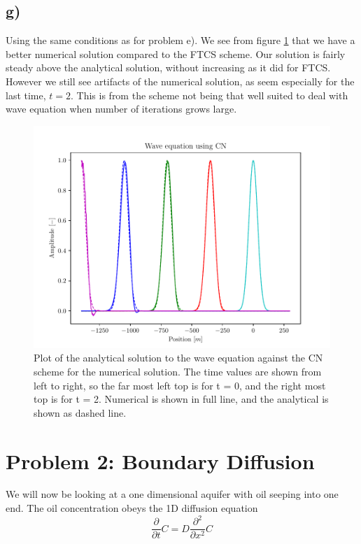 \documentclass[10pt, a4paper]{amsart}
\begin{document}
\subsection{g)}
Using the same conditions as for problem e). We see from figure \ref{fig:1g} that we have a better numerical solution compared to the FTCS scheme. Our solution is fairly steady above the analytical solution, without increasing as it did for FTCS. However we still see artifacts of the numerical solution, as seem especially for the last time, $t = 2$. This is from the scheme not being that well suited to deal with wave equation when number of iterations grows large. 

\begin{figure}[h]
	\centering
	\includegraphics[width=0.9\linewidth]{"../code/CN.pdf"}
	\caption{Plot of the analytical solution to the wave equation against the CN scheme for the numerical solution. The time values are shown from left to right, so the far most left top is for t = 0, and the right most top is for t = 2. Numerical is shown in full line, and the analytical is shown as dashed line.}
	\label{fig:1g}
\end{figure}

\section{Problem 2: Boundary Diffusion}
We will now be looking at a one dimensional aquifer with oil seeping into one end. The oil concentration obeys the 1D diffusion equation
\begin{equation}
	\frac{\partial }{\partial t}C = D \frac{\partial^2}{\partial x^2} C
\end{equation}
\end{document}
